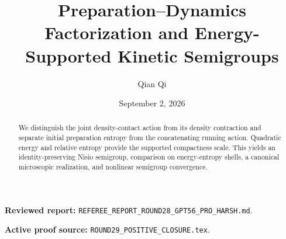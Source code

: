 \documentclass[11pt,reqno]{amsart}
\title[B4 Round 29 revision]{Preparation--Dynamics Factorization and Energy-Supported Kinetic Semigroups}
\author{Qian Qi}
\date{September 2, 2026}
\begin{document}
\begin{abstract}We distinguish the joint density-contact action from its density contraction and separate initial preparation entropy from the concatenating running action. Quadratic energy and relative entropy provide the supported compactness scale. This yields an identity-preserving Nisio semigroup, comparison on energy-entropy shells, a canonical microscopic realization, and nonlinear semigroup convergence.\end{abstract}
\maketitle
\noindent\textbf{Reviewed report:} \texttt{REFEREE\_REPORT\_ROUND28\_GPT56\_PRO\_HARSH.md}.\par
\noindent\textbf{Active proof source:} \texttt{ROUND29\_POSITIVE\_CLOSURE.tex}.\par

\end{document}
